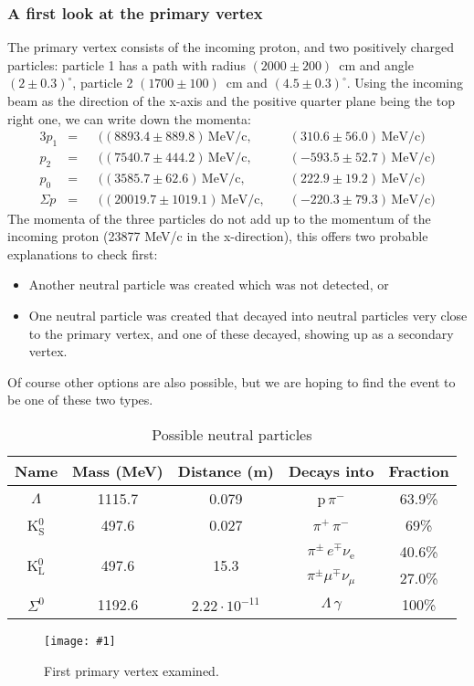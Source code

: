 \documentclass[twocolumn]{article}
\newcommand{\insertFigure}[1]{%
   \texttt{[image: \#1]}%
}
\begin{document}
\subsubsection{A first look at the primary vertex}
The primary vertex consists of the incoming proton, and two positively charged particles: particle 1 has a path with radius $(2000 \pm 200)$~cm and angle $(2 \pm 0.3)^{\circ}$, particle 2 $(1700 \pm 100)$~cm and $(4.5 \pm 0.3)^{\circ}$. Using the incoming beam as the direction of the x-axis and the positive quarter plane being the top right one, we can write down the momenta:
\begin{alignat*}{3}
p_1 &= &&((8893.4 \pm 889.8)\, \text{MeV/c},\hspace{3pt} && (310.6 \pm 56.0)\, \text{MeV/c})\\
p_2 &= &&((7540.7 \pm 444.2)\, \text{MeV/c},\hspace{3pt} && (-593.5 \pm 52.7)\, \text{MeV/c})\\
p_0 &= &&((3585.7 \pm 62.6)\, \text{MeV/c},\hspace{3pt} && (222.9 \pm 19.2)\, \text{MeV/c})\\[6pt]
\Sigma p &= &&((20019.7 \pm 1019.1)\, \text{MeV/c},\hspace{3pt} && (-220.3 \pm 79.3)\, \text{MeV/c})
\end{alignat*}
The momenta of the three particles do not add up to the momentum of the incoming proton (23877 MeV/c in the x-direction), this offers two probable explanations to check first:
\begin{itemize}
\item Another neutral particle was created which was not detected, or
\item One neutral particle was created that decayed into neutral particles very close to the primary vertex, and one of these decayed, showing up as a secondary vertex.
\end{itemize}
Of course other options are also possible, but we are hoping to find the event to be one of these two types.\\
\begin{table}
\centering
\begin{tabular}{|c|c|c|c|c|}
\hline
Name & Mass (MeV) & Distance (m) & Decays into & Fraction \\
\hline
$\Lambda$ 	& 1115.7 & 0.079 &p$\, \pi^-$ & 63.9\%\\
\hline
K$^0_{\text{S}}$	 & 497.6 & 0.027 & $\pi^+ \, \pi^-$ & 69\%\\
\hline
\multirow{2}{*}{K$^0_{\text{L}}$} &  \multirow{2}{*}{ 497.6}& \multirow{2}{*}{15.3}&$\pi^{\pm} \, e^{\mp} \nu_{\text{e}}$ & 40.6\%\\
 & & &$\pi^{\pm} \mu ^{\mp} \nu_{\mu}$&27.0\%\\
\hline
$\Sigma^0$ & 1192.6 & $2.22 \cdot 10^{-11}$& $\Lambda \, \gamma$ & 100\%\\
\hline
\end{tabular}
\caption{Possible neutral particles\cite{pdg}}
\label{tab:neutral}
\end{table}
\begin{figure}
\centering
\insertFigure{Images/primary_1.png}
\caption{First primary vertex examined.}
\label{fig:primary1}
\end{figure}
\end{document}
